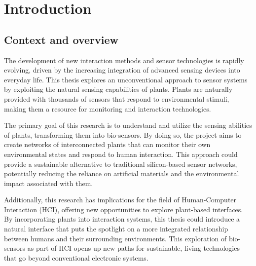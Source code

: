 \section{Introduction}




\subsection{Context and overview}

The development of new interaction methods and sensor technologies is rapidly evolving, driven by the increasing integration of advanced sensing devices into everyday life. This thesis explores an unconventional approach to sensor systems by exploiting the natural sensing capabilities of plants. Plants are naturally provided with thousands of sensors that respond to environmental stimuli, making them a resource for monitoring and interaction technologies.

The primary goal of this research is to understand and utilize the sensing abilities of plants, transforming them into bio-sensors. By doing so, the project aims to create networks of interconnected plants that can monitor their own environmental states and respond to human interaction. This approach could provide a sustainable alternative to traditional silicon-based sensor networks, potentially reducing the reliance on artificial materials and the environmental impact associated with them.

Additionally, this research has implications for the field of Human-Computer Interaction (HCI), offering new opportunities to explore plant-based interfaces. By incorporating plants into interaction systems, this thesis could introduce a natural interface that puts the spotlight on a more integrated relationship between humans and their surrounding environments. This exploration of bio-sensors as part of HCI opens up new paths for sustainable, living technologies that go beyond conventional electronic systems.


